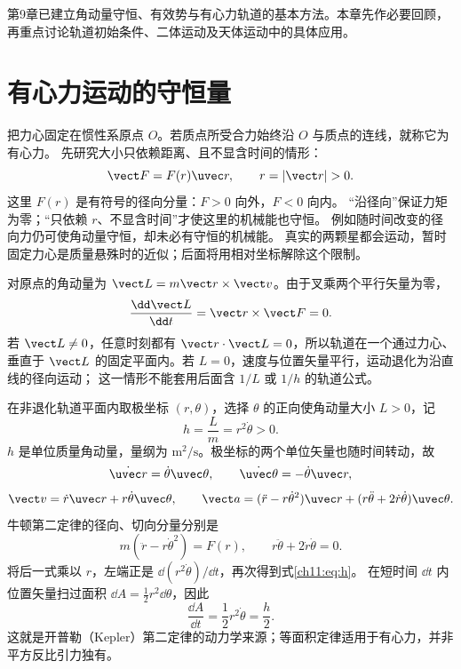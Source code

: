 第9章已建立角动量守恒、有效势与有心力轨道的基本方法。本章先作必要回顾，再重点讨论轨道初始条件、二体运动及天体运动中的具体应用。

\section{有心力运动的守恒量}
\label{ch11:sec:central}

把力心固定在惯性系原点 $O$。若质点所受合力始终沿 $O$ 与质点的连线，就称它为有心力。
先研究大小只依赖距离、且不显含时间的情形：
\begin{equation}\label{ch11:eq:central-force}
 \vect F=F(r)\uvec r,\qquad r=|\vect r|>0.
\end{equation}
这里 $F(r)$ 是有符号的径向分量：$F>0$ 向外，$F<0$ 向内。
“沿径向”保证力矩为零；“只依赖 $r$、不显含时间”才使这里的机械能也守恒。
例如随时间改变的径向力仍可使角动量守恒，却未必有守恒的机械能。
真实的两颗星都会运动，暂时固定力心是质量悬殊时的近似；后面将用相对坐标解除这个限制。

对原点的角动量为 $\vect L=m\vect r\times\vect v$。由于叉乘两个平行矢量为零，
\begin{equation}
 \frac{\dd\vect L}{\dd t}=\vect r\times\vect F=0.
\end{equation}
若 $\vect L\ne0$，任意时刻都有 $\vect r\cdot\vect L=0$，所以轨道在一个通过力心、垂直于
$\vect L$ 的固定平面内。若 $L=0$，速度与位置矢量平行，运动退化为沿直线的径向运动；
这一情形不能套用后面含 $1/L$ 或 $1/h$ 的轨道公式。

在非退化轨道平面内取极坐标 $(r,\theta)$，选择 $\theta$ 的正向使角动量大小 $L>0$，记
\begin{equation}\label{ch11:eq:h}
 h=\frac Lm=r^2\dot\theta>0.
\end{equation}
$h$ 是单位质量角动量，量纲为 $\mathrm{m^2/s}$。极坐标的两个单位矢量也随时间转动，故
\[
 \dot{\uvec r}=\dot\theta\uvec\theta,\qquad
 \dot{\uvec\theta}=-\dot\theta\uvec r,
\]
\[
 \vect v=\dot r\uvec r+r\dot\theta\uvec\theta,\qquad
 \vect a=(\ddot r-r\dot\theta^2)\uvec r
 +(r\ddot\theta+2\dot r\dot\theta)\uvec\theta.
\]
牛顿第二定律的径向、切向分量分别是
\begin{equation}\label{ch11:eq:polar-newton}
 m(\ddot r-r\dot\theta^2)=F(r),\qquad
 r\ddot\theta+2\dot r\dot\theta=0.
\end{equation}
将后一式乘以 $r$，左端正是 $\dd(r^2\dot\theta)/\dd t$，再次得到式\eqref{ch11:eq:h}。
在短时间 $\dd t$ 内位置矢量扫过面积 $\dd A=\tfrac12r^2\dd\theta$，因此
\begin{equation}\label{ch11:eq:area-law}
 \frac{\dd A}{\dd t}=\frac12r^2\dot\theta=\frac h2.
\end{equation}
这就是开普勒（Kepler）第二定律的动力学来源；等面积定律适用于有心力，并非平方反比引力独有。

